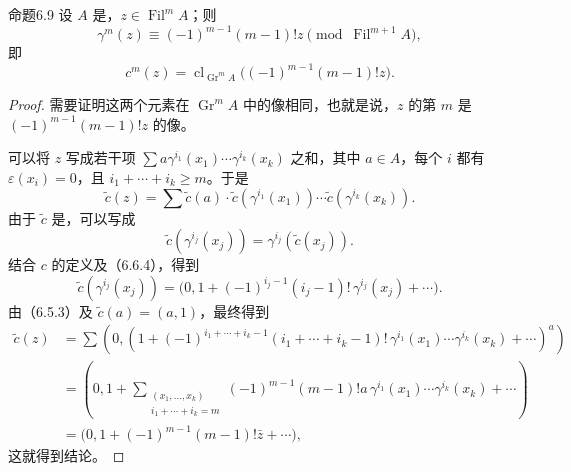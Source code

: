 \begin{SGAresult}{命题}{6.9}
设 $A$ 是，$z\in\operatorname{Fil}^mA$；则
\[
\gamma^m(z)\equiv(-1)^{m-1}(m-1)!z
 \pmod{\operatorname{Fil}^{m+1}A},
\]
即
\[
c^m(z)=\operatorname{cl}_{\operatorname{Gr}^mA}
 \bigl((-1)^{m-1}(m-1)!z\bigr).
\]
\end{SGAresult}
\begin{proof}
需要证明这两个元素在 $\operatorname{Gr}^mA$ 中的像相同，也就是说，$z$ 的第 $m$ 是 $(-1)^{m-1}(m-1)!z$ 的像。

可以将 $z$ 写成若干项
$\sum a\gamma^{i_1}(x_1)\cdots\gamma^{i_k}(x_k)$ 之和，其中 $a\in A$，每个 $i$ 都有 $\varepsilon(x_i)=0$，且 $i_1+\cdots+i_k\geqslant m$。于是
\[
\widetilde c(z)=\sum\widetilde c(a)\cdot
 \widetilde c(\gamma^{i_1}(x_1))\cdots
 \widetilde c(\gamma^{i_k}(x_k)).
\]
由于 $\widetilde c$ 是，可以写成
\[
\widetilde c(\gamma^{i_j}(x_j))
 =\gamma^{i_j}(\widetilde c(x_j)).
\]
结合 $c$ 的定义及（6.6.4），得到
\[
\widetilde c(\gamma^{i_j}(x_j))
 =\bigl(0,1+(-1)^{i_j-1}(i_j-1)!\,\gamma^{i_j}(x_j)+\cdots\bigr).
\]
由（6.5.3）及 $\widetilde c(a)=(a,1)$，最终得到
\[
\begin{aligned}
\widetilde c(z)
 &=\sum\left(0,
 \left(1+(-1)^{i_1+\cdots+i_k-1}(i_1+\cdots+i_k-1)!
 \,\gamma^{i_1}(x_1)\cdots\gamma^{i_k}(x_k)+\cdots\right)^a\right)\\
 &=\left(0,1+
 \sum_{\substack{(x_1,\ldots,x_k)\\i_1+\cdots+i_k=m}}
 (-1)^{m-1}(m-1)!a\,
 \gamma^{i_1}(x_1)\cdots\gamma^{i_k}(x_k)+\cdots\right)\\
 &=\bigl(0,1+(-1)^{m-1}(m-1)!\bar z+\cdots\bigr),
\end{aligned}
\]
这就得到结论。
\end{proof}


